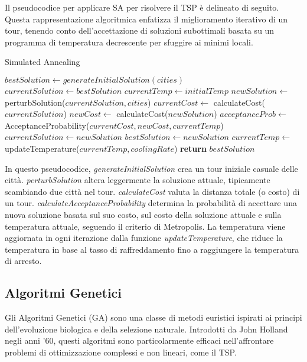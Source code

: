 Il pseudocodice per applicare \gls{SA} per risolvere il \gls{TSP} è delineato di seguito. Questa rappresentazione algoritmica enfatizza il miglioramento iterativo di un tour, tenendo conto dell'accettazione di soluzioni subottimali basata su un programma di temperatura decrescente per sfuggire ai minimi locali.

\begin{algorithm}
	\caption{Simulated Annealing}\label{alg:detailedsimulatedannealing}
	\begin{algorithmic}[1]
		\State $bestSolution \gets generateInitialSolution(cities)$
		\State $currentSolution \gets bestSolution$
		\State $currentTemp \gets initialTemp$
		\State $newSolution \gets$ perturbSolution($currentSolution, cities$)
		\State $currentCost \gets$ calculateCost($currentSolution$)
		\State $newCost \gets$ calculateCost($newSolution$)
		\State $acceptanceProb \gets$ AcceptanceProbability($currentCost, newCost, currentTemp$)
		\State $currentSolution \gets newSolution$
		\State $bestSolution \gets newSolution$
		\EndIf
		\EndIf
		\State $currentTemp \gets$ updateTemperature($currentTemp, coolingRate$)
		\EndWhile
		\State \textbf{return} $bestSolution$
		\EndProcedure
	\end{algorithmic}
\end{algorithm}

In questo pseudocodice, \emph{generateInitialSolution} crea un tour iniziale casuale delle città. \emph{perturbSolution} altera leggermente la soluzione attuale, tipicamente scambiando due città nel tour. \emph{calculateCost} valuta la distanza totale (o costo) di un tour. \emph{calculateAcceptanceProbability} determina la probabilità di accettare una nuova soluzione basata sul suo costo, sul costo della soluzione attuale e sulla temperatura attuale, seguendo il criterio di Metropolis\cite{metropolis1953equation}. La temperatura viene aggiornata in ogni iterazione dalla funzione \emph{updateTemperature}, che riduce la temperatura in base al tasso di raffreddamento fino a raggiungere la temperatura di arresto.

\subsection{Algoritmi Genetici}

Gli Algoritmi Genetici (\gls{GA}) sono una classe di metodi euristici ispirati ai principi dell'evoluzione biologica e della selezione naturale. Introdotti da John Holland negli anni '60, questi algoritmi sono particolarmente efficaci nell'affrontare problemi di ottimizzazione complessi e non lineari, come il \gls{TSP}.


